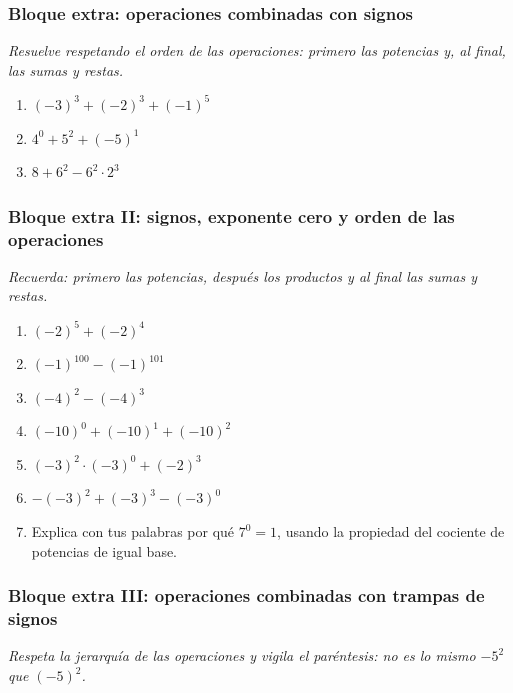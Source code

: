 \documentclass[12pt, letterpaper]{article}
\begin{document}
\subsubsection*{Bloque extra: operaciones combinadas con signos}
\textit{Resuelve respetando el orden de las operaciones: primero las potencias y, al final, las sumas y restas.}

\begin{enumerate}[leftmargin=*, start=16]
  \item \medio{} $(-3)^3 + (-2)^3 + (-1)^5$

  \item \medio{} $4^0 + 5^2 + (-5)^1$

  \item \dificil{} $8 + 6^2 - 6^2 \cdot 2^3$
\end{enumerate}

\subsubsection*{Bloque extra II: signos, exponente cero y orden de las operaciones}
\textit{Recuerda: primero las potencias, después los productos y al final las sumas y restas.}

\begin{enumerate}[leftmargin=*, start=19]
  \item \medio{} $(-2)^5 + (-2)^4$

  \item \medio{} $(-1)^{100} - (-1)^{101}$

  \item \medio{} $(-4)^2 - (-4)^3$

  \item \medio{} $(-10)^0 + (-10)^1 + (-10)^2$

  \item \medio{} $(-3)^2 \cdot (-3)^0 + (-2)^3$

  \item \dificil{} $-(-3)^2 + (-3)^3 - (-3)^0$

  \item \dificil{} Explica con tus palabras por qué $7^0 = 1$, usando la propiedad del cociente de potencias de igual base.
\end{enumerate}
\subsubsection*{Bloque extra III: operaciones combinadas con trampas de signos}
\textit{Respeta la jerarquía de las operaciones y vigila el paréntesis: no es lo mismo $-5^2$ que $(-5)^2$.}
\end{document}
